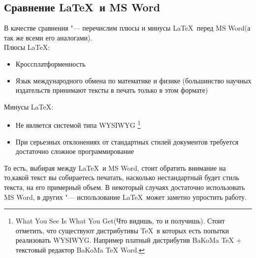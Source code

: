 \documentclass{article}
\begin{document}
		\subsection{Сравнение \LaTeX ~и MS Word}
			В качестве сравнения "--- перечислим плюсы и минусы \LaTeX ~перед MS Word(а так же всеми его аналогами). \\	
	    Плюсы \LaTeX: 
	    \begin{itemize} 
	    	\item	Кроссплатформенность 
	    	\item	Язык международного обмена по математике и физике (большинство     
   					научных издательств принимают тексты в печать  только в этом формате)
    	\end{itemize}
    Минусы \LaTeX:
		\begin{itemize} 
	    	\item	Не является системой типа WYSIWYG
	    				\footnote{What You See Is What You Get(Что видишь, то и получишь). Стоит отметить, что существуют 									дистрибутивы \TeX ~в которых есть попытки реализовать WYSIWYG. Например платный дистрибутив  BaKoMa TeX + 						текстовый редактор  BaKoMa TeX Word.}   
	    	\item	При серьезных отклонениях от стандартных стилей документов требуется
					достаточно сложное программирование	
    	\end{itemize}
    	
    		То есть, выбирая между \LaTeX ~и MS Word, стоит обратить внимание на то,какой текст вы собираетесь печатать, 					насколько нестандартный будет стиль текста, на его примерный объем. В некоторый случаях достаточно использовать MS Word,   		в других "--- использование \LaTeX ~может заметно упростить работу.
		\newpage		
\end{document}
